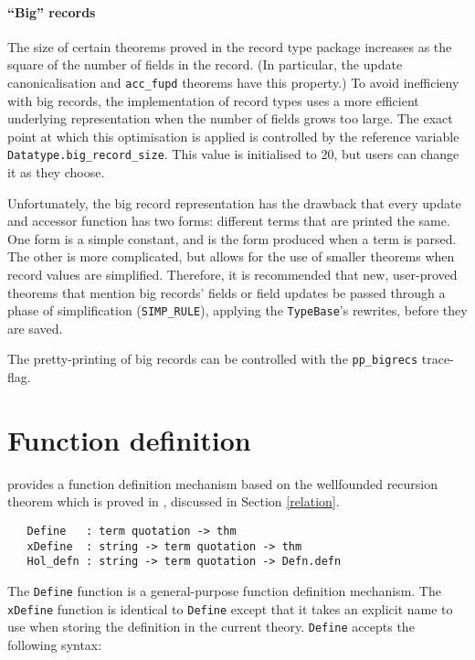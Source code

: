 \paragraph{``Big'' records} The size of certain theorems proved in the
record type package increases as the square of the number of fields in
the record.  (In particular, the update canonicalisation and
\texttt{acc\_fupd} theorems have this property.) To avoid inefficieny
with big records, the implementation of record types uses a more
efficient underlying representation when the number of fields grows
too large.  The exact point at which this optimisation is applied is
controlled by the reference variable
\texttt{Datatype.big\_record\_size}.  This value is initialised to 20,
but users can change it as they choose.

Unfortunately, the big record representation has the drawback that
every update and accessor function has two forms: different terms that
are printed the same.  One form is a simple constant, and is the form
produced when a term is parsed.  The other is more complicated, but
allows for the use of smaller theorems when record values are
simplified.  Therefore, it is recommended that new, user-proved
theorems that mention big records' fields or field updates be passed
through a phase of simplification (\texttt{SIMP\_RULE}), applying the
\texttt{TypeBase}'s rewrites, before they are saved.

The pretty-printing of big records can be controlled with the
\texttt{pp\_bigrecs} trace-flag.


\section{Function definition}\label{TFL}

\HOL{} provides a function definition mechanism based on the
wellfounded recursion theorem which is proved in ,
discussed in Section \ref{relation}.

\begin{verbatim}
   Define   : term quotation -> thm
   xDefine  : string -> term quotation -> thm
   Hol_defn : string -> term quotation -> Defn.defn
\end{verbatim}

The \texttt{Define} function is a general-purpose function definition
mechanism. The \texttt{xDefine} function is identical to
{\small\verb+Define+} except that it takes an explicit name to use when
storing the definition in the current theory. {\small\tt Define}
accepts the following syntax:

